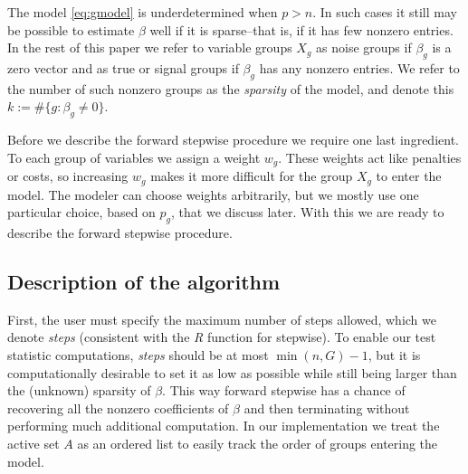 \documentclass{imsart}
\newcommand{\argmax}{\mathop{\mathrm{argmax}}}
\newcommand{\norm}[1]{\lVert #1 \rVert}
\begin{document}
The model \eqref{eq:gmodel} is underdetermined when $p > n$.
In such cases it still may be possible to
estimate $\beta$ well if it is sparse--that is, if it has few nonzero
entries. In the rest of this paper we refer to variable groups $X_g$
as noise groups if $\beta_g$ is a zero vector and as true or signal
groups if $\beta_g$ has any nonzero entries. We refer to the number
of such nonzero groups as the \textit{sparsity} of the model, and
denote this $k := \# \{ g : \beta_g \neq 0 \}$.

Before we describe the forward stepwise procedure we require one last
ingredient. To each group of variables we assign a weight $w_g$. These
weights act like penalties or costs, so increasing $w_g$ makes it
more difficult for the group $X_g$ to enter the model. The
modeler can choose weights arbitrarily, but we mostly use one
particular choice, based on $p_g$, that we discuss later. With this we
are ready to describe the forward stepwise procedure.


\subsection{Description of the algorithm}

First, the user must specify the maximum number of steps allowed,
which we denote \textit{steps} (consistent with the \textit{R} function
for stepwise). To enable our test statistic computations,
\textit{steps} should be at most $\min (n, G) - 1$, but it is
computationally desirable to set it as low as possible while still being
larger than the (unknown) sparsity of $\beta$.
This way forward stepwise has a chance of recovering all the nonzero
coefficients of $\beta$ and then terminating without performing much
additional computation.
In our implementation we treat the active set $A$ as an ordered list to easily track the order of groups entering the model.

\end{document}
